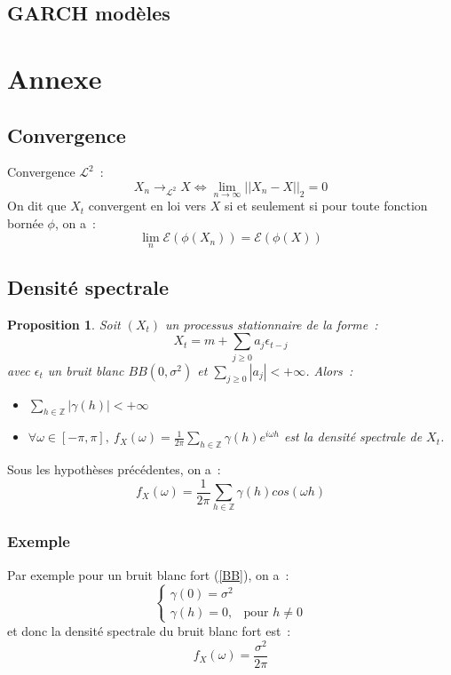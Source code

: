 \documentclass[11pt]{scrartcl} %
\newtheorem{pro}[theorem]{Proposition}
\begin{document}
\subsection{GARCH modèles}

\section{Annexe}
\subsection{Convergence}
Convergence $\mathcal{L}^2$~:
$$
X_n\rightarrow_{\mathcal{L^2}} X \Leftrightarrow  \lim_{n\rightarrow \infty}||X_n-X||_2=0
$$
On dit que $X_t$ convergent en loi vers $X$ si et seulement si pour toute fonction bornée $\phi$, on a~:~
$$
\lim_{n}\mathcal{E}(\phi(X_n))=\mathcal{E}\left(\phi(X)\right)
$$
\subsection{Densité spectrale}
\begin{pro}
Soit $(X_t)$ un processus stationnaire de la forme~:
$$
X_t = m+\sum_{j\geq 0}a_j\epsilon_{t-j}
$$
avec $\epsilon_t$ un bruit blanc $BB(0,\sigma^2)$ et $\sum_{j\geq 0}|a_j|<+\infty$. Alors~:
\begin{itemize}
\item $\sum_{h\in\mathbb{Z}}|\gamma(h)|<+\infty$\\
\item $\forall \omega\in[-\pi,\pi],~f_X(\omega)=\frac{1}{2\pi}\sum_{h\in\mathbb{Z}}\gamma(h)e^{i\omega h}$ est la densité spectrale de $X_t$.
\end{itemize}
\end{pro}
Sous les hypothèses précédentes, on a~:
$$
f_X(\omega)=\frac{1}{2\pi}\sum_{h\in\mathbb{Z}}\gamma(h)cos(\omega h)
$$
\subsubsection*{Exemple}
Par exemple pour un bruit blanc fort (\ref{BB}), on a~:
$$
\left\{
\begin{array}{cc}
\gamma(0)=\sigma^2&\\
\gamma(h)= 0,& \textrm{pour $h\not=0$} 
\end{array}
\right.
$$
et donc la densité spectrale du bruit blanc fort est~:
$$
f_X(\omega) = \frac{\sigma^2}{2\pi}
$$
\end{document}
